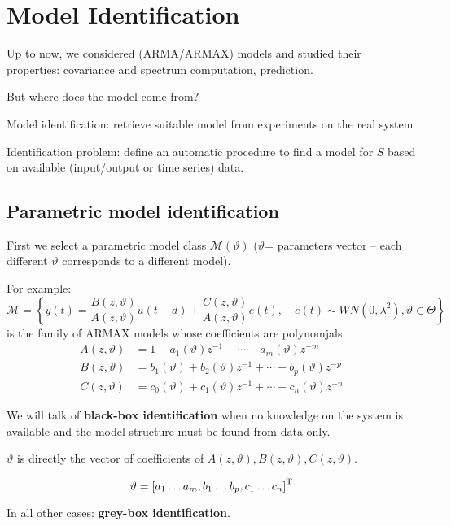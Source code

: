 \section{Model Identification}

Up to now, we considered (ARMA/ARMAX) models and studied their properties: covariance and spectrum computation, prediction.

But where does the model come from?

Model identification: retrieve suitable model from experiments on the real system 


Identification problem: define an automatic procedure to find a model for $S$ based on available (input/output or time series) data.


\subsection{Parametric model identification}

First we select a parametric model class $\mathcal{M}(\vartheta)$ ($\vartheta$= parameters vector – each different $\vartheta$ corresponds to a different model).

For example:
$$
	\mathcal{M}=\left\{y(t)=\frac{B(z, \vartheta)}{A(z, \vartheta)} u(t-d)+\frac{C(z, \vartheta)}{A(z, \vartheta)} e(t), \quad e(t) \sim WN\left(0, \lambda^{2}\right), \vartheta\in\Theta\right\}
$$
is the family of ARMAX models whose coefficients are polynomjals.
\begin{align*}
	A(z, \vartheta)&=1-a_{1}(\vartheta) z^{-1}-\cdots-a_{m}(\vartheta) z^{-m} \\
	B(z, \vartheta)&=b_{1}(\vartheta)+b_{2}(\vartheta) z^{-1}+\cdots+b_{p}(\vartheta) z^{-p}\\
	C(z, \vartheta)&=c_0(\vartheta)+c_{1}(\vartheta) z^{-1}+\cdots+c_{n}(\vartheta) z^{-n}
\end{align*}

We will talk of \textbf{black-box identification} when no knowledge on the system is available and the model structure must be found from data only.

$\vartheta$ is directly the vector of coefficients of $A(z, \vartheta),B(z, \vartheta),C(z, \vartheta)$.

$$
	\vartheta=\left[a_{1}  \ldots a_{m},  b_{1} \ldots b_{p} ,c_{1} \ldots c_{n}\right]^{\mathrm{T}}
$$

In all other cases: \textbf{grey-box identification}.

